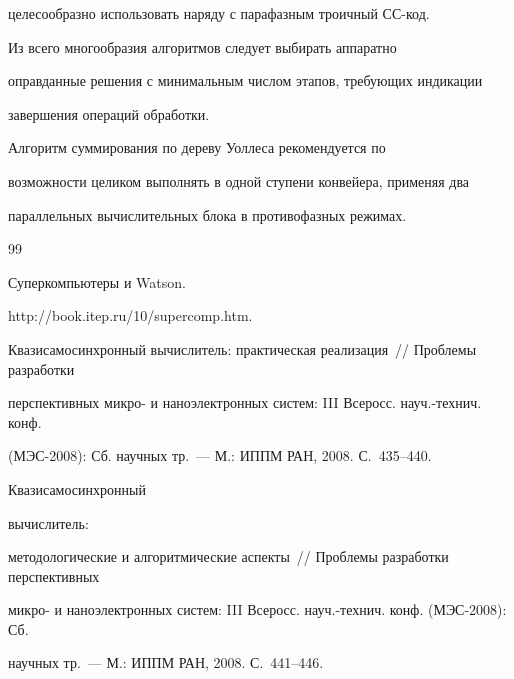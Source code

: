 целесообразно использовать наряду с парафазным троичный СС-код.



      Из всего многообразия алгоритмов следует выбирать аппаратно

оправданные решения с минимальным числом этапов, требующих индикации

завершения операций обработки.



      Алгоритм суммирования по дереву Уоллеса рекомендуется по

возможности целиком выполнять в одной ступени конвейера, применяя два

параллельных вычислительных блока в противофазных режимах.



{\small\frenchspacing

 {%


 \begin{thebibliography}{99}


 Суперкомпьютеры и Watson.

{\sf http://book.itep.ru/10/\linebreak supercomp.htm}.







Квазисамосинхронный вычислитель: практическая реализация~/\!\!/ Проблемы разработки

перспективных микро- и наноэлектронных систем: III Всеросс. науч.-технич. конф.

(МЭС-2008): Сб. научных тр.~--- М.: ИППМ РАН, 2008. С.~435--440.




 Квазисамосинхронный

вы\-чис\-ли\-тель:

методологические и алгоритмические аспекты~/\!\!/ Проб\-ле\-мы разработки перспективных

микро- и наноэлектронных систем: III Всеросс. науч.-технич. конф. (МЭС-2008): Сб.

научных тр.~--- М.: ИППМ РАН, 2008. С.~441--446.




\end{thebibliography}}}
